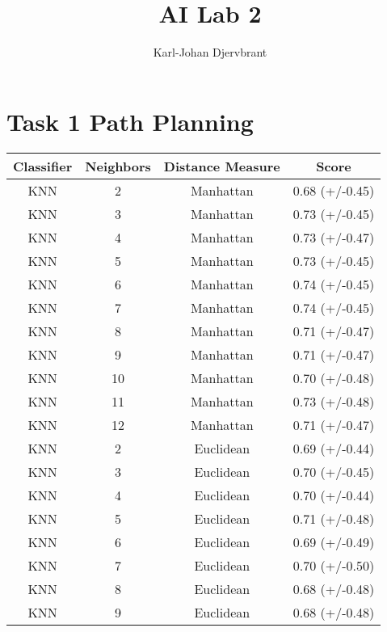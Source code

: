 \documentclass{article}
\title{AI Lab 2}
\author{Karl-Johan Djervbrant}
\begin{document}
    \maketitle

    \section{Task 1 Path Planning}
    \begin{tabular}{cccc}
      \toprule
      Classifier &  Neighbors & Distance Measure &           Score \\
      \midrule
      KNN &          2 &              Manhattan &  0.68 (+/-0.45) \\
      KNN &          3 &              Manhattan &  0.73 (+/-0.45) \\
      KNN &          4 &              Manhattan &  0.73 (+/-0.47) \\
      KNN &          5 &              Manhattan &  0.73 (+/-0.45) \\
      KNN &          6 &              Manhattan &  0.74 (+/-0.45) \\
      KNN &          7 &              Manhattan &  0.74 (+/-0.45) \\
      KNN &          8 &              Manhattan &  0.71 (+/-0.47) \\
      KNN &          9 &              Manhattan &  0.71 (+/-0.47) \\
      KNN &         10 &              Manhattan &  0.70 (+/-0.48) \\
      KNN &         11 &              Manhattan &  0.73 (+/-0.48) \\
      KNN &         12 &              Manhattan &  0.71 (+/-0.47) \\
      KNN &          2 &              Euclidean &  0.69 (+/-0.44) \\
      KNN &          3 &              Euclidean &  0.70 (+/-0.45) \\
      KNN &          4 &              Euclidean &  0.70 (+/-0.44) \\
      KNN &          5 &              Euclidean &  0.71 (+/-0.48) \\
      KNN &          6 &              Euclidean &  0.69 (+/-0.49) \\
      KNN &          7 &              Euclidean &  0.70 (+/-0.50) \\
      KNN &          8 &              Euclidean &  0.68 (+/-0.48) \\
      KNN &          9 &              Euclidean &  0.68 (+/-0.48) \\

\end{tabular}
\end{document}
